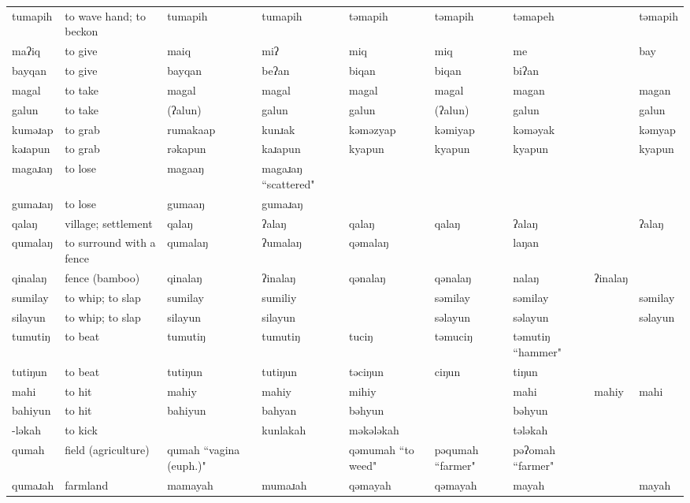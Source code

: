 \begin{landscape}
\begin{longtable}{*{9}{p{}}}
\text{*}tumapih & to wave hand; to beckon & tumapih & tumapih & təmapih & təmapih & təmapeh &  & təmapih\\
\text{*}maʔiq & to give & maiq & miʔ & miq & miq & me &  & bay\\
\text{*}bayqan & to give & bayqan & beʔan & biqan & biqan & biʔan &  & \\
\text{*}magal & to take & magal & magal & magal & magal & magan &  & magan\\
\text{*}galun & to take & (ʔalun) & galun & galun & (ʔalun) & galun &  & galun\\
\text{*}kuməɹap & to grab & rumakaap & kunɹak & kəməzyap & kəmiyap & kəməyak &  & kəmyap\\
\text{*}kəɹapun & to grab & rəkapun & kaɹapun & kyapun & kyapun & kyapun &  & kyapun\\
\text{*}magaɹaŋ & to lose & magaaŋ & magaɹaŋ ``scattered" &  &  &  &  & \\
\text{*}gumaɹaŋ & to lose & gumaaŋ & gumaɹaŋ &  &  &  &  & \\
\text{*}qalaŋ & village; settlement & qalaŋ & ʔalaŋ & qalaŋ & qalaŋ & ʔalaŋ &  & ʔalaŋ\\
\text{*}qumalaŋ & to surround with a fence & qumalaŋ & ʔumalaŋ & qəmalaŋ &  & laŋan &  & \\
\text{*}qinalaŋ & fence (bamboo) & qinalaŋ & ʔinalaŋ & qənalaŋ & qənalaŋ & nalaŋ & ʔinalaŋ & \\
\text{*}sumilay & to whip; to slap & sumilay & sumiliy &  & səmilay & səmilay &  & səmilay\\
\text{*}silayun & to whip; to slap & silayun & silayun &  & səlayun & səlayun &  & səlayun\\
\text{*}tumutiŋ & to beat & tumutiŋ & tumutiŋ & tuciŋ & təmuciŋ & təmutiŋ ``hammer" &  & \\
\text{*}tutiŋun & to beat & tutiŋun & tutiŋun & təciŋun & ciŋun & tiŋun &  & \\
\text{*}mahi & to hit & mahiy & mahiy & mihiy &  & mahi & mahiy & mahi\\
\text{*}bahiyun & to hit & bahiyun & bahyan & bəhyun &  & bəhyun &  & \\
\text{*}-ləkah & to kick &  & kunlakah & məkələkah &  & tələkah &  & \\
\text{*}qumah & field (agriculture) & qumah ``vagina (euph.)" &  & qəmumah ``to weed" & pəqumah ``farmer" & pəʔomah ``farmer" &  & \\
\text{*}qumaɹah & farmland & mamayah & mumaɹah & qəmayah & qəmayah & mayah &  & mayah\\

\end{longtable}
\end{landscape}
